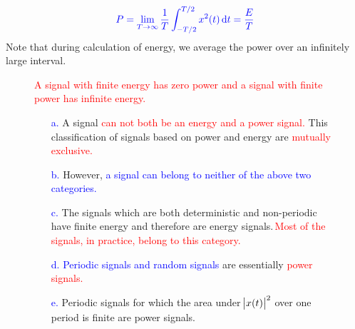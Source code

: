 \documentclass[../notes-main.tex]{subfiles}
\begin{document}
\begin{equation}
    \textcolor{blue}{P = \lim_{T \to \infty} \frac{1}{T} \int_{-T/2}^{T/2} x^2(t) \dif t = \frac{E}{T}}
    \label{eq:average-power-def}
\end{equation}
\noindent Note that during calculation of energy, we average the power over an infinitely large interval.
\begin{figure}[H]
    \centering
    \begin{mdframed}
        \begin{center}
            \textcolor{red}{%
                A signal with finite energy has zero power and a signal with finite power has infinite energy.}
        \end{center}
    \end{mdframed}\label{fig:energy-power-relationship-1}
    \vspace{-1em}
\end{figure}
\vspace{-1em}
\begin{figure}[H]
    \centering
    \begin{mdframed}
        \begin{center}
            \begin{itemize}
                \item[\textcolor{blue}{a.}] A signal \textcolor{red}{can not both be an energy and a power signal.} This classification of signals based on power and energy are \textcolor{red}{mutually exclusive.}
                \item[\textcolor{blue}{b.}] However, \textcolor{blue}{a signal can belong to neither of the above two categories.}
                \item[\textcolor{blue}{c.}] The signals which are both deterministic and non-periodic have finite energy and therefore are energy signals.\,\textcolor{red}{Most of the signals, in practice, belong to this category.}
                \item[\textcolor{blue}{d.}] \textcolor{blue}{Periodic signals and random signals} are essentially \textcolor{red}{power signals.}
                \item[\textcolor{blue}{e.}] Periodic signals for which the area under \(\abs{x(t)}^2\) over one period is finite are power signals.
            \end{itemize}
        \end{center}
    \end{mdframed}\label{fig:energy-power-relationship-2}
    \vspace{-1em}
\end{figure}
\vspace{-1em}
\end{document}
